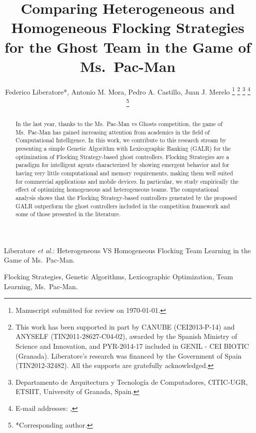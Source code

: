 \documentclass[journal]{IEEEtran}
\begin{document}
\title{Comparing Heterogeneous and Homogeneous Flocking Strategies for the Ghost Team in the Game of Ms.\  Pac-Man}

\author{Federico Liberatore*, Antonio M. Mora, Pedro A. Castillo, Juan J. Merelo
\thanks{Manuscript submitted for review on \today.}%
\thanks{This work has been supported in part by CANUBE (CEI2013-P-14) and ANYSELF (TIN2011-28627-C04-02), awarded by the Spanish Ministry of Science and Innovation, and PYR-2014-17 included in GENIL - CEI BIOTIC (Granada). Liberatore's research was financed by the Government of Spain (TIN2012-32482). All the supports are gratefully acknowledged.}%
\thanks{Departamento de Arquitectura y Tecnolog\'ia de Computadores,
CITIC-UGR, ETSIIT,
University of Granada, Spain.}%
\thanks{E-mail addresses: \mailsa, \mailsb}%
\thanks{*Corresponding author.}}

%
{Liberatore \MakeLowercase{\textit{et al.}}: Heterogeneous VS Homogeneous Flocking Team Learning in the Game of Ms.\  Pac-Man.}
\maketitle

\begin{abstract}
In the last year, thanks to the Ms.\  Pac-Man vs Ghosts competition, the
game of Ms.\  Pac-Man has gained increasing attention from academics in
the field of Computational Intelligence. In this work, we contribute
to this research stream by presenting a simple Genetic
Algorithm with Lexicographic Ranking (GALR) for the optimization of Flocking Strategy-based ghost controllers. Flocking Strategies are a paradigm for intelligent agents
characterized by showing emergent behavior and for having very little
computational and memory requirements, making them well suited for
commercial applications and mobile devices. In particular, we study
empirically the effect of optimizing homogeneous and heterogeneous
teams. The computational analysis shows that the Flocking
Strategy-based controllers generated by the proposed GALR outperform the ghost controllers
included in the competition framework and some of those presented in the
literature. 
\end{abstract}
\begin{IEEEkeywords}
Flocking Strategies, Genetic Algorithms, Lexicographic Optimization, Team Learning, Ms.\  Pac-Man.
\end{IEEEkeywords}
\end{document}
